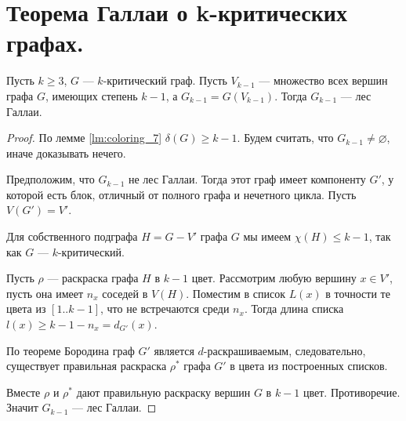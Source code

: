 \section{Теорема Галлаи о k-критических графах.}
\begin{theorem}[Галлаи, 1963]
    Пусть $k \ge 3$, $G$ --- $k$-критический граф. Пусть $V_{k-1}$ --- множество всех вершин графа $G$, имеющих степень $k-1$, а $G_{k-1} = G(V_{k-1})$. Тогда $G_{k-1}$ --- лес Галлаи.
\end{theorem}
\begin{proof}
	По лемме \ref{lm:coloring_7} $\delta(G) \ge k-1$. Будем считать, что $G_{k-1} \neq \varnothing$, иначе доказывать нечего.

	Предположим, что $G_{k-1}$ не лес Галлаи. Тогда этот граф имеет компоненту $G'$, у которой есть блок, отличный от полного графа и нечетного цикла. Пусть $V(G') = V'$.

	Для собственного подграфа $H = G - V'$ графа $G$ мы имеем $\chi(H) \le k-1$, так как $G$ --- $k$-критический.

	Пусть $\rho$ --- раскраска графа $H$ в  $k-1$ цвет. Рассмотрим любую вершину $x \in  V'$, пусть она имеет $n_x$ соседей  в $V(H)$. Поместим в список $L(x)$ в точности те цвета из $[1..k-1]$, что не встречаются среди $n_x$. Тогда длина списка $l(x) \ge k-1-n_x = d_{G'}(x)$.

	По теореме Бородина граф $G'$ является $d$-раскрашиваемым, следовательно, существует правильная раскраска $\rho^*$  графа $G'$ в цвета из построенных списков.

	Вместе $\rho$ и $\rho^*$ дают правильную раскраску вершин $G$ в $k-1$ цвет. Противоречие. Значит $G_{k-1}$ --- лес Галлаи.
\end{proof}
